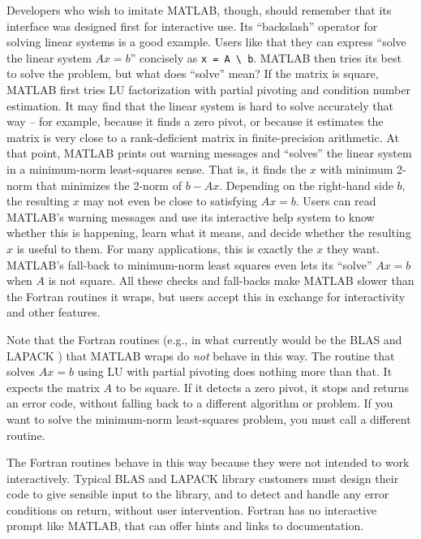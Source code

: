 Developers who wish to imitate MATLAB, though, should remember that
its interface was designed first for interactive use.  Its
``backslash'' operator for solving linear systems is a good example.
Users like that they can express ``solve the linear system $Ax=b$''
concisely as \texttt{x = A \textbackslash\ b}.  MATLAB then tries its best to solve
the problem, but what does ``solve'' mean?  If the matrix is square,
MATLAB first tries LU factorization with partial pivoting and
condition number estimation.  It may find that the linear system is
hard to solve accurately that way -- for example, because it finds a
zero pivot, or because it estimates the matrix is very close to a
rank-deficient matrix in finite-precision arithmetic.  At that point,
MATLAB prints out warning messages and ``solves'' the linear system in
a minimum-norm least-squares sense.  That is, it finds the $x$ with
minimum 2-norm that minimizes the 2-norm of $b - Ax$.  Depending on
the right-hand side $b$, the resulting $x$ may not even be close to
satisfying $Ax = b$.  Users can read MATLAB's warning messages and use
its interactive help system to know whether this is happening, learn
what it means, and decide whether the resulting $x$ is useful to them.
For many applications, this is exactly the $x$ they want.  MATLAB's
fall-back to minimum-norm least squares even lets its ``solve'' $Ax=b$
when $A$ is not square.  All these checks and fall-backs make MATLAB
slower than the Fortran routines it wraps, but users accept this in
exchange for interactivity and other features.

Note that the Fortran routines (e.g., in what currently would be the
BLAS \cite{BLAS-standard} and LAPACK \cite{LAPACK-Users-Guide}) that
MATLAB wraps do \emph{not} behave in this way.  The routine that
solves $Ax=b$ using LU with partial pivoting does nothing more than
that.  It expects the matrix $A$ to be square.  If it detects a zero
pivot, it stops and returns an error code, without falling back to a
different algorithm or problem.  If you want to solve the minimum-norm
least-squares problem, you must call a different routine.

The Fortran routines behave in this way because they were not intended
to work interactively.  Typical BLAS and LAPACK library customers must
design their code to give sensible input to the library, and to detect
and handle any error conditions on return, without user intervention.
Fortran has no interactive prompt like MATLAB, that can offer hints
and links to documentation.

